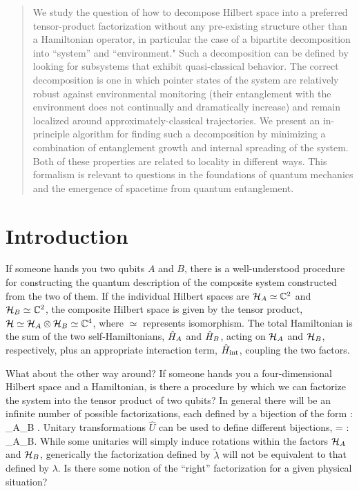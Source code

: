 \documentclass[aps,pra,onecolumn,nofootinbib,11pt,tightenlines]{revtex4-1}
\begin{document}
\newcommand{\sean}[1]{\textbf{\color{red}{#1}}}
\newcommand{\ashmeet}[1]{\textbf{\color{blue}{#1}}}
\newcommand{\todo}[1]{\textbf{\color{orange}{#1}}}
\begin{abstract}
We study the question of how to decompose Hilbert space into a preferred tensor-product factorization without any pre-existing structure other than a Hamiltonian operator, in particular the case of a bipartite decomposition into ``system'' and ``environment."
Such a decomposition can be defined by looking for subsystems that exhibit quasi-classical behavior.
The correct decomposition is one in which pointer states of the system are relatively robust against environmental monitoring (their entanglement with the environment does not continually and dramatically increase) and remain localized around approximately-classical trajectories. 
We present an in-principle algorithm for finding such a decomposition by minimizing a combination of entanglement growth and internal spreading of the system.
Both of these properties are related to locality in different ways.
This formalism is relevant to questions in the foundations of quantum mechanics and the emergence of spacetime from quantum entanglement.
\end{abstract}
\maketitle
\newpage
\tableofcontents
\newpage
\section{Introduction}

If someone hands you two qubits $A$ and $B$, there is a well-understood procedure for constructing the quantum description of the composite system constructed from the two of them.
If the individual Hilbert spaces are $\mathcal{H}_A\simeq \mathbb{C}^2$ and $\mathcal{H}_B\simeq \mathbb{C}^2$, the composite Hilbert space is given by the tensor product, $\mathcal{H} \simeq \mathcal{H}_A\otimes \mathcal{H}_B \simeq \mathbb{C}^4$, where $\simeq$ represents isomorphism.
The total Hamiltonian is the sum of the two self-Hamiltonians, $\hat{H}_A$ and $\hat{H}_B$, acting on $\mathcal{H}_A$ and $\mathcal{H}_B$, respectively, plus an appropriate interaction term, $\hat{H}_{\rm{int}}$, coupling the two factors.

What about the other way around?
If someone hands you a four-dimensional Hilbert space and a Hamiltonian, is there a procedure by which we can factorize the system into the tensor product of two qubits?
In general there will be an infinite number of possible factorizations, each defined by a bijection of the form 
\be
\lambda : \hs \rightarrow \hs_A\otimes \hs_B .
\ee
Unitary transformations $\hat U$ can be used to define different bijections, 
\be
\tilde\lambda = \lambda \circ {} : \hs \rightarrow \hs_A\otimes \hs_B.
\ee
While some unitaries will simply induce rotations within the factors $\mathcal{H}_A$ and $\mathcal{H}_B$, generically the factorization defined by $\tilde\lambda$ will not be equivalent to that defined by $\lambda$.
Is there some notion of the ``right'' factorization for a given physical situation?
\end{document}
